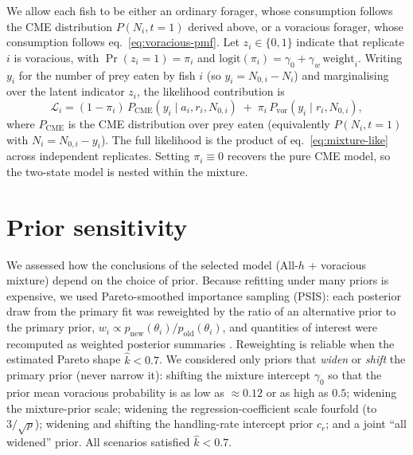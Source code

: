 We allow each fish to be either an ordinary forager, whose consumption follows the CME distribution $P(N_i, t = 1)$ derived above, or a voracious forager, whose consumption follows eq.\ \eqref{eq:voracious-pmf}. Let $z_i \in \{0, 1\}$ indicate that replicate $i$ is voracious, with $\Pr(z_i = 1) = \pi_i$ and $\mathrm{logit}(\pi_i) = \gamma_0 + \gamma_w \, \mathrm{weight}_i$. Writing $y_i$ for the number of prey eaten by fish $i$ (so $y_i = N_{0,i} - N_i$) and marginalising over the latent indicator $z_i$, the likelihood contribution is
\begin{equation}
\label{eq:mixture-like}
\mathcal{L}_i = (1 - \pi_i)\, P_{\mathrm{CME}}(y_i \mid a_i, r_i, N_{0,i}) \; + \; \pi_i \, P_{\mathrm{vor}}(y_i \mid r_i, N_{0,i}),
\end{equation}
where $P_{\mathrm{CME}}$ is the CME distribution over prey eaten (equivalently $P(N_i, t=1)$ with $N_i = N_{0,i} - y_i$). The full likelihood is the product of eq.\ \eqref{eq:mixture-like} across independent replicates. Setting $\pi_i \equiv 0$ recovers the pure CME model, so the two-state model is nested within the mixture.

\section{Prior sensitivity}
\label{supp:prior_sensitivity}

We assessed how the conclusions of the selected model (All-$h$ + voracious
mixture) depend on the choice of prior. Because refitting under many priors is
expensive, we used Pareto-smoothed importance sampling (PSIS): each posterior draw
from the primary fit was reweighted by the ratio of an alternative prior to the
primary prior, $w_i \propto p_{\text{new}}(\theta_i)/p_{\text{old}}(\theta_i)$,
and quantities of interest were recomputed as weighted posterior summaries
\citep{vehtariPracticalBayesianModel2017}. Reweighting is reliable when the
estimated Pareto shape $\hat{k} < 0.7$. We considered only priors that
\emph{widen} or \emph{shift} the primary prior (never narrow it): shifting the
mixture intercept $\gamma_0$ so that the prior mean voracious probability is as low
as $\approx 0.12$ or as high as $0.5$; widening the mixture-prior scale; widening
the regression-coefficient scale fourfold (to $3/\sqrt{p}$); widening and shifting
the handling-rate intercept prior $c_r$; and a joint ``all widened'' prior. All
scenarios satisfied $\hat{k} < 0.7$.

